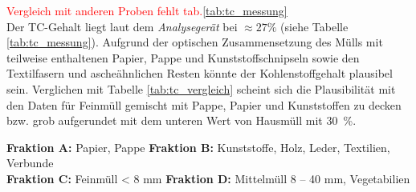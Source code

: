 \newpage
\textcolor{red}{Vergleich mit anderen Proben fehlt tab.\ref{tab:tc_messung}}\\
Der TC-Gehalt liegt laut dem \textit{Analysegerät} bei $\approx 27\%$ (siehe Tabelle \ref{tab:tc_messung}). Aufgrund der optischen Zusammensetzung des Mülls mit teilweise enthaltenen Papier, Pappe und Kunststoffschnipseln sowie den Textilfasern und ascheähnlichen Resten könnte der Kohlenstoffgehalt plausibel sein. Verglichen mit Tabelle \ref{tab:tc_vergleich} \cite[S.11]{HansGunterRamke.} scheint sich die Plausibilität mit den Daten für Feinmüll gemischt mit Pappe, Papier und Kunststoffen zu decken bzw. grob aufgerundet mit dem unteren Wert von Hausmüll mit \SI{30}{\percent}.
\vspace*{-3.5mm}
\renewcommand{\arraystretch}{1.2}
\begin{table}[h!]
	\centering
	\caption[Elementgehalte von Restabfall und ausgewählter Fraktionen]{Elementgehalte von Restabfall und ausgewählter Fraktionen \cite[S.11]{HansGunterRamke.}}
	\label{tab:tc_vergleich}
\end{table}
\FloatBarrier
{\footnotesize \textbf{Fraktion A:} Papier, Pappe \quad \quad \quad \hspace*{0.7mm} \textbf{Fraktion B:} Kunststoffe, Holz, Leder, Textilien, Verbunde}\\
{\footnotesize \textbf{Fraktion C:} Feinmüll < 8 mm \quad \quad \textbf{Fraktion D:} Mittelmüll 8 – 40 mm, Vegetabilien}\\

